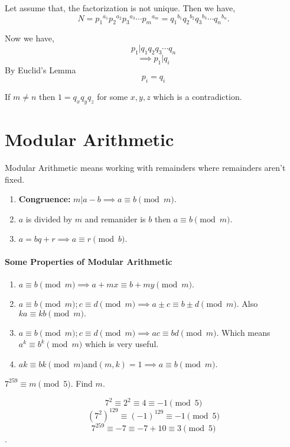 Let assume that, the factorization is not unique. Then we have, 
\[ N ={p_1}^{a_1} {p_2}^{a_2} {p_3}^{a_3} \cdots {p_m}^{a_m} ={q_1}^{b_1} {q_2}^{b_2} {q_3}^{b_3} \cdots {q_n}^{b_n}. \]

Now we have,
\[p_1 | q_1 q_2 q_3 \cdots q_n\]
\[\implies p_1 | q_i\]
By Euclid's Lemma \[p_i = q_i\]

If $m\neq n$ then $1=q_x q_y q_z$ for some $x,y,z$ which is a contradiction.

\section{Modular Arithmetic}

Modular Arithmetic means working with remainders where remainders aren't fixed. 
\begin{enumerate}
	\item \textbf{Congruence:}
		$m|a-b \implies a \equiv b \pmod m$.
	\item $a$ is divided by $m$ and remanider is $b$ then $a\equiv b \pmod m$.
	\item $a=bq+r \implies a\equiv r \pmod b.$
\end{enumerate}

\paragraph{Some Properties of Modular Arithmetic}
\begin{enumerate}
	\item $a\equiv b \pmod m \implies a+mx \equiv b+my \pmod m .$
	\item $a\equiv b \pmod m; c \equiv d \pmod m \implies a \pm c \equiv b \pm d \pmod m .$
	Also $ ka \equiv kb \pmod m .$
	\item $a\equiv b \pmod m; c \equiv d \pmod m \implies ac \equiv bd \pmod m.$
	Which means $a^k \equiv b^k \pmod m$ which is very useful.
	\item $ak \equiv bk \pmod m \mathrm{and} (m,k)=1 \implies a \equiv b\pmod m.$
\end{enumerate}

\begin{example}
$7^{259} \equiv m \pmod 5 .$ Find $m$.
\end{example}

\begin{soln}
$$7^2 \equiv 2^2 \equiv 4 \equiv -1 \pmod 5$$ $$ (7^2)^{129} \equiv (-1)^{129} \equiv -1 \pmod 5 $$
$$ 7^{259} \equiv -7 \equiv -7+10 \equiv 3 \pmod 5 $$.
\end{soln}

